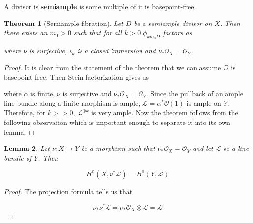 \documentclass[a4paper]{article}
\newtheorem{theorem}{Theorem}
\newtheorem{lemma}[theorem]{Lemma}
\numberwithin{theorem}{section}
\begin{document}
A divisor is \textbf{semiample} is some multiple of it is basepoint-free. 

\begin{theorem}[Semiample fibration]\label{semifib}
Let $D$ be a semiample divisor on $X$. Then there exists an $m_0 > 0$ such that for all $k > 0$ $\phi_{km_0D}$ factors as

\begin{center}
\end{center}


where $\nu$ is surjective, $\iota_k$ is a closed immersion and ${\nu}_* \mathcal{O}_X = \mathcal{O}_Y$.
\end{theorem}

\begin{proof}
It is clear from the statement of the theorem that we can assume $D$ is basepoint-free. Then Stein factorization gives us

\begin{center}
\end{center}

where $\alpha$ is finite, $\nu$ is surjective and $\nu_*\mathcal{O}_X = \mathcal{O}_Y$. Since the pullback of an ample line bundle along a finite morphism is ample, $\mathcal{L} = \alpha^* \mathcal{O}(1)$ is ample on $Y$. Therefore, for $k >> 0$, $\mathcal{L}^{\otimes k}$ is very ample. Now the theorem follows from the following observation which is important enough to separate it into its own lemma.

\end{proof}

\begin{lemma}
Let $\nu: X \rightarrow Y$ be a morphism such that $\nu_* \mathcal{O}_X = \mathcal{O}_Y$ and let $\mathcal{L}$ be a line bundle of $Y$. Then

$$ H^0(X, \nu^* \mathcal{L}) = H^0(Y, \mathcal{L}) $$\end{lemma}

\begin{proof}
The projection formula tells us that

$$ \nu_*\nu^* \mathcal{L} = \nu_* \mathcal{O}_X \otimes \mathcal{L} = \mathcal{L} $$

\end{proof}
\end{document}
